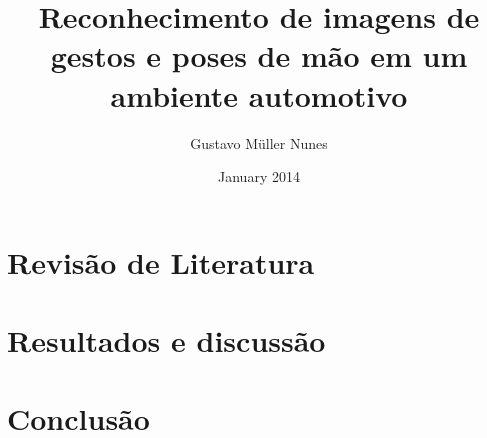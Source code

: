 \documentclass[a4paper,11pt,oneside]{book}
\begin{document}
\author{Gustavo Müller Nunes}
\title{Reconhecimento de imagens de gestos e poses de mão em um ambiente automotivo}
\date{January 2014}

\maketitle
\tableofcontents 	%
\listoftables 		%
\listoffigures 		%

%

\chapter{Revisão de Literatura}


\chapter{Resultados e discussão}
\chapter{Conclusão}
\end{document}
